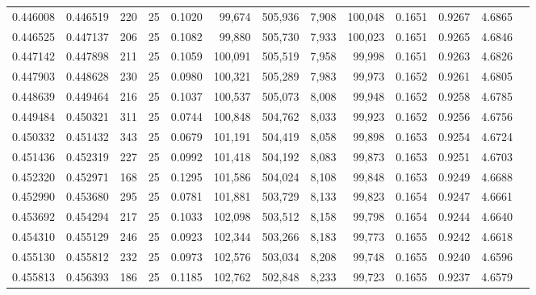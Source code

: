 \begin{tabular}{rrrrrrrrrrrrr}
0.446008 & 0.446519 &   220 &  25 &                                     0.1020 &  99,674 & 505,936 &   7,908 & 100,048 & 0.1651 & 0.9267 & 4.6865 \\
0.446525 & 0.447137 &   206 &  25 &                                     0.1082 &  99,880 & 505,730 &   7,933 & 100,023 & 0.1651 & 0.9265 & 4.6846 \\
0.447142 & 0.447898 &   211 &  25 &                                     0.1059 & 100,091 & 505,519 &   7,958 &  99,998 & 0.1651 & 0.9263 & 4.6826 \\
0.447903 & 0.448628 &   230 &  25 &                                     0.0980 & 100,321 & 505,289 &   7,983 &  99,973 & 0.1652 & 0.9261 & 4.6805 \\
0.448639 & 0.449464 &   216 &  25 &                                     0.1037 & 100,537 & 505,073 &   8,008 &  99,948 & 0.1652 & 0.9258 & 4.6785 \\
0.449484 & 0.450321 &   311 &  25 &                                     0.0744 & 100,848 & 504,762 &   8,033 &  99,923 & 0.1652 & 0.9256 & 4.6756 \\
0.450332 & 0.451432 &   343 &  25 &                                     0.0679 & 101,191 & 504,419 &   8,058 &  99,898 & 0.1653 & 0.9254 & 4.6724 \\
0.451436 & 0.452319 &   227 &  25 &                                     0.0992 & 101,418 & 504,192 &   8,083 &  99,873 & 0.1653 & 0.9251 & 4.6703 \\
0.452320 & 0.452971 &   168 &  25 &                                     0.1295 & 101,586 & 504,024 &   8,108 &  99,848 & 0.1653 & 0.9249 & 4.6688 \\
0.452990 & 0.453680 &   295 &  25 &                                     0.0781 & 101,881 & 503,729 &   8,133 &  99,823 & 0.1654 & 0.9247 & 4.6661 \\
0.453692 & 0.454294 &   217 &  25 &                                     0.1033 & 102,098 & 503,512 &   8,158 &  99,798 & 0.1654 & 0.9244 & 4.6640 \\
0.454310 & 0.455129 &   246 &  25 &                                     0.0923 & 102,344 & 503,266 &   8,183 &  99,773 & 0.1655 & 0.9242 & 4.6618 \\
0.455130 & 0.455812 &   232 &  25 &                                     0.0973 & 102,576 & 503,034 &   8,208 &  99,748 & 0.1655 & 0.9240 & 4.6596 \\
0.455813 & 0.456393 &   186 &  25 &                                     0.1185 & 102,762 & 502,848 &   8,233 &  99,723 & 0.1655 & 0.9237 & 4.6579 \\

\end{tabular}
